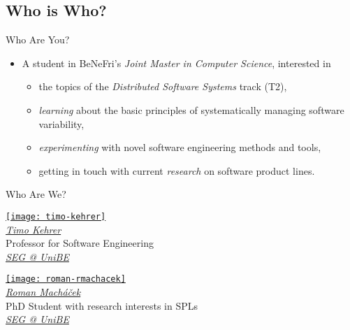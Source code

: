 \subsection{Who is Who?}

\begin{frame}{\myframetitle}
	\begin{mycolumns}
		\begin{example}{Who Are You?}
			\begin{itemize}
				\item A student in BeNeFri's \emph{Joint Master in Computer Science}, interested in
				\begin{itemize}
					\item the topics of the \emph{Distributed Software Systems} track (T2),
					\item \emph{learning} about the basic principles of systematically managing software variability,
					\item \emph{experimenting} with novel software engineering methods and tools,
					\item getting in touch with current \emph{research} on software product lines.
				\end{itemize}
			\end{itemize}
		\end{example}
	\mynextcolumn
		\begin{note}{Who Are We?}
			\centering
			\parbox{0.45\linewidth}{
				\centering
				\href{https://seg.inf.unibe.ch/people/timo/}{\texttt{[image: timo-kehrer]}}\\[.5ex]
				\href{https://seg.inf.unibe.ch/people/timo/}{\emph{Timo Kehrer}}\\[.5ex]
				\small Professor for Software Engineering \\[.5ex]
				\href{https://seg.inf.unibe.ch/}{\small \emph{SEG @ UniBE}}
			}
			\parbox{0.45\linewidth}{
				\centering
				\href{https://seg.inf.unibe.ch/people/}{\texttt{[image: roman-rmachacek]}}\\[.5ex]
				\href{https://seg.inf.unibe.ch/people/}{\emph{Roman Macháček}}\\[.5ex]
				\small PhD Student with research interests in SPLs \\[.5ex]
				\href{https://seg.inf.unibe.ch/}{\small \emph{SEG @ UniBE}}
			}
		\end{note}
	\end{mycolumns}
\end{frame}

